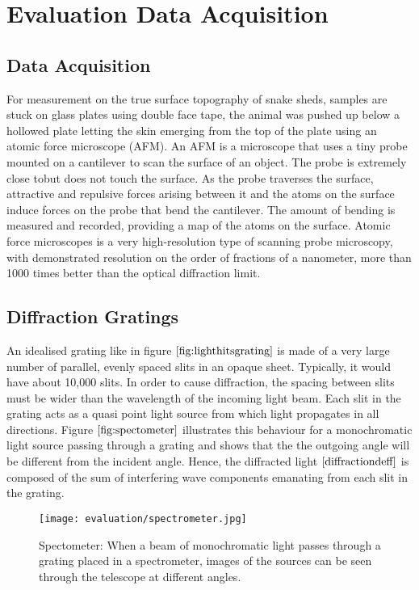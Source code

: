 \chapter{Evaluation Data Acquisition}
\section{Data Acquisition}
For measurement on the true surface topography of snake sheds, samples are stuck on glass plates using double face tape, the animal was pushed up below a hollowed plate letting the skin emerging from the top of the plate using an atomic force microscope (AFM). An AFM is a microscope that uses a tiny probe mounted on a cantilever to scan the surface of an object. The probe is extremely close tobut does not touch the surface. As the probe traverses the surface, attractive and repulsive forces arising between it and the atoms on the surface induce forces on the probe that bend the cantilever. The amount of bending is measured and recorded, providing a map of the atoms on the surface. Atomic force microscopes is a very high-resolution type of scanning probe microscopy, with demonstrated resolution on the order of fractions of a nanometer, more than 1000 times better than the optical diffraction limit.

\section{Diffraction Gratings}
An idealised grating like in figure $\ref{fig:lighthitsgrating}$ is made of a very large number of parallel, evenly spaced slits in an opaque sheet. Typically, it would have about 10,000 slits. In order to cause diffraction, the spacing between slits must be wider than the wavelength of the incoming light beam. Each slit in the grating acts as a quasi point light source from which light propagates in all directions. Figure $\ref{fig:spectometer}$ illustrates this behaviour for a monochromatic light source passing through a grating and shows that the the outgoing angle will be different from the incident angle. Hence, the diffracted light $\ref{diffractiondeff}$ is composed of the sum of interfering wave components emanating from each slit in the grating.

\begin{figure}[H]
  \centering
  \texttt{[image: evaluation/spectrometer.jpg]}
  \caption{Spectometer: When a beam of monochromatic light passes through a grating placed in a spectrometer, images of the sources can be seen through the telescope at different angles.}
\label{fig:spectometer}
\end{figure}

